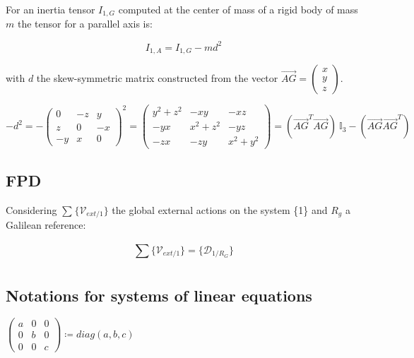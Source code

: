 \documentclass[\main/main.tex]{subfiles}
\begin{document}
For an inertia tensor $I_{1, G}$ computed at the center of mass of a rigid body of mass $m$ the tensor for a parallel axis is:

\begin{equation}
 \label{appendix:notation:parallel_axis}
 I_{1, A} = I_{1, G} - m d^2
\end{equation}

with $d$ the skew-symmetric matrix constructed from the vector $\overrightarrow{AG} = \begin{pmatrix}
x \\
y \\
z
\end{pmatrix}$.

{\centering
 $ -d^2 = -\begin{pmatrix}
 0 & -z & y \\
 z & 0 & -x \\
 -y & x & 0
 \end{pmatrix}^2
 = \begin{pmatrix}
 y^2 + z^2 & -xy & -xz \\
 -yx & x^2 + z^2 & -yz \\
 -zx & -zy & x^2 + y^2
 \end{pmatrix}
 = (\overrightarrow{AG}^T \overrightarrow{AG}) \ \mathbb{I}_3 - (\overrightarrow{AG} \overrightarrow{AG}^T)$
 \par}


\subsection{\ac{FPD}}

Considering $\sum_{}^{} \{ \mathcal{V}_{ext/1} \}$ the global external actions on the system \{1\} and $R_g$ a Galilean reference:

\begin{equation}
 \sum_{}^{} \{ \mathcal{V}_{ext/1} \} = \{ \mathcal{D}_{1/R_G} \}
 \label{appendix:notation:fpd}
\end{equation}


\subsection{Notations for systems of linear equations}
\label{notation:matrix}
{\centering
 $ \begin{pmatrix}
  a & 0 & 0 \\
  0 & b & 0 \\
  0 & 0 & c
 \end{pmatrix}
 \coloneqq diag(a, b, c)$
 \par}
\end{document}
